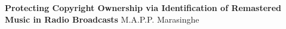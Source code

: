 \begin{titlepage}
    \begin{center}
        \textbf{\Huge{Protecting Copyright Ownership via Identification of Remastered Music in Radio Broadcasts}}
        \vfill
        \huge{M.A.P.P. Marasinghe}
    \end{center}
\end{titlepage}